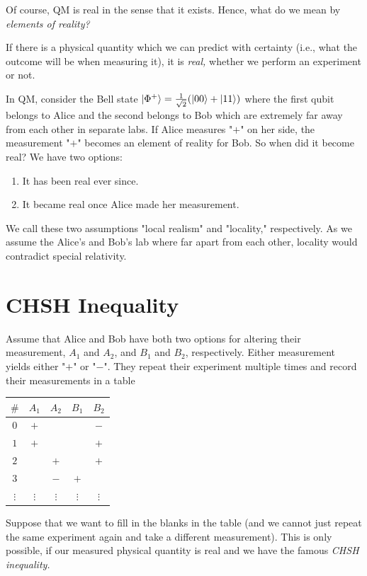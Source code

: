 	Of course, \ac{QM} is real in the sense that it exists. Hence, what do we mean by \emph{elements of reality?}
	\begin{definition}  \label{def:real}
		If there is a physical quantity which we can predict with certainty (i.e., what the outcome will be when measuring it), it is \emph{real,} whether we perform an experiment or not.
	\end{definition}
	In \ac{QM}, consider the Bell state \( \ket{\Phi^+} = \frac{1}{\sqrt{2}} (\ket{00} + \ket{11}) \) where the first qubit belongs to Alice and the second belongs to Bob which are extremely far away from each other in separate labs. If Alice measures "\(+\)" on her side, the measurement "\(+\)" becomes an element of reality for Bob. So when did it become real? We have two options:
	\begin{enumerate}
		\item It has been real ever since.
		\item It became real once Alice made her measurement.
	\end{enumerate}
	We call these two assumptions "local realism" and "locality," respectively. As we assume the Alice's and Bob's lab where far apart from each other, locality would contradict special relativity.

	\section{CHSH Inequality}
		Assume that Alice and Bob have both two options for altering their measurement, \(A_1\) and \(A_2\), and \(B_1\) and \(B_2\), respectively. Either measurement yields either "\(+\)" or "\(-\)". They repeat their experiment multiple times and record their measurements in a table
		\begin{center}
			\begin{tabular}{c|cc|cc}
				  \(\#\)   &  \(A_1\)   &  \(A_2\)   &  \(B_1\)   &  \(B_2\)   \\ \midrule
				  \(0\)    &   \(+\)    &            &            &   \(-\)    \\
				  \(1\)    &   \(+\)    &            &            &   \(+\)    \\
				  \(2\)    &            &   \(+\)    &            &   \(+\)    \\
				  \(3\)    &            &   \(-\)    &   \(+\)    &            \\
				\(\vdots\) & \(\vdots\) & \(\vdots\) & \(\vdots\) & \(\vdots\)
			\end{tabular}
		\end{center}
		Suppose that we want to fill in the blanks in the table (and we cannot just repeat the same experiment again and take a different measurement). This is only possible, if our measured physical quantity is real and we have the famous \emph{CHSH inequality.}

